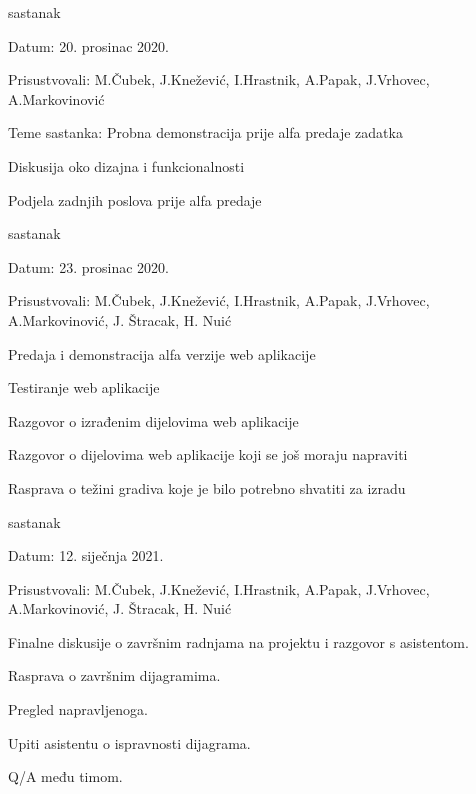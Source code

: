 \begin{packed_enum}
			\item  sastanak
			\item[] \begin{packed_item}
				\item Datum: 20. prosinac 2020.
				\item Prisustvovali: M.Čubek, J.Knežević, I.Hrastnik, A.Papak,  J.Vrhovec, A.Markovinović
				\item Teme sastanka: Probna demonstracija prije alfa predaje zadatka
				\begin{packed_item}
					\item Diskusija oko dizajna i funkcionalnosti
					\item Podjela zadnjih poslova prije alfa predaje
				\end{packed_item}
			\end{packed_item}
		
			\item  sastanak
			\item[] \begin{packed_item}
				\item Datum: 23. prosinac 2020.
				\item Prisustvovali: M.Čubek, J.Knežević, I.Hrastnik, A.Papak,  J.Vrhovec, A.Markovinović, J. Štracak, H. Nuić
				\item Predaja i demonstracija alfa verzije web aplikacije
				\begin{packed_item}
					\item Testiranje web aplikacije
					\item Razgovor o izrađenim dijelovima web aplikacije
					\item Razgovor o dijelovima web aplikacije koji se još moraju napraviti
					\item Rasprava o težini gradiva koje je bilo potrebno shvatiti za izradu
				\end{packed_item}
			\end{packed_item}
		
			\item  sastanak
			\item[] \begin{packed_item}
				\item Datum: 12. siječnja 2021.
				\item Prisustvovali: M.Čubek, J.Knežević, I.Hrastnik, A.Papak,  J.Vrhovec, A.Markovinović, J. Štracak, H. Nuić
				\item Finalne diskusije o završnim radnjama na projektu i razgovor s asistentom.
				\begin{packed_item}
					\item Rasprava o završnim dijagramima.
					\item Pregled napravljenoga.
					\item Upiti asistentu o ispravnosti dijagrama.
					\item Q/A među timom.
				\end{packed_item}
			\end{packed_item}
						
			
		\end{packed_enum}
		
